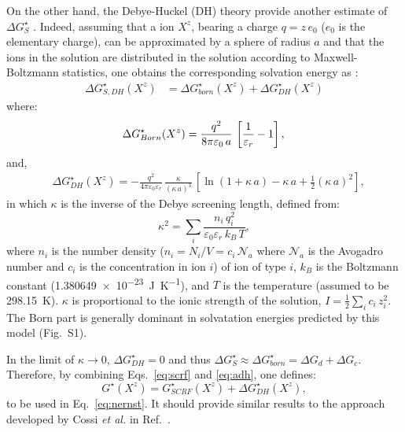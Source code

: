 \documentclass[review]{elsarticle}
\begin{document}
On the other hand, the Debye-Huckel (DH) theory provide another estimate of $\Delta G_{S}^\star$ \cite{bockrisModernElectrochemistryIonics1998}. Indeed, assuming that a ion $X^z$, bearing a charge $q = z\,e_0$ ($e_0$ is the elementary charge), can be approximated by a sphere of radius $a$ and that the ions in the solution are distributed in the solution according to Maxwell-Boltzmann statistics, one obtains the corresponding solvation energy as \cite{kontogeorgisDebyeHuckelTheoryIts2018,silvaDerivationsDebyeHuckel2022,silvaImprovingBornEquation2024}:\begin{align}
	\Delta G^\star_{S,DH}(X^z)
	&= \Delta G^\star_{born}(X^z) + \Delta G^\star_{DH}(X^z)\label{eq:adh}
\end{align}
where:
\begin{equation}
	\Delta G^\star_{Born}(X^z) =\frac{q^2}{8\pi\varepsilon_0\,a}\,\left[\frac{1}{\varepsilon_r}-1\right], \label{eq:born}\\
\end{equation}
and,
\begin{align}
	&\Delta G^\star_{DH}(X^z) = -\frac{q^2}{4\pi\varepsilon_0\varepsilon_r}\,\frac{\kappa}{(\kappa\,a)^3}\,\left[\ln(1+\kappa\,a)-\kappa\,a+\frac{1}{2}(\kappa\,a)^2\right],\label{eq:dh} \end{align}
in which $\kappa$ is the inverse of the Debye screening length, defined from:\begin{equation}
	\kappa^2 = \sum_i \frac{n_i\,q_i^2}{\varepsilon_0\varepsilon_r\,k_B\,T}, \label{eq:kappa2}
\end{equation}
where $n_i$ is the number density ($n_i = N_i / V = c_i\,\mathcal{N}_a$ where $\mathcal{N}_a$ is the Avogadro number and $c_i$ is the concentration in ion $i$) of ion of type $i$, $k_B$ is the Boltzmann constant (\SI{1.380649e-23}{\joule\per\kelvin}), and $T$ is the temperature (assumed to be \SI{298.15}{\kelvin}).  $\kappa$ is  proportional to the ionic strength of the solution, $I = \frac{1}{2}\sum_i c_i\,z_i^2$.  The Born part is generally dominant in solvatation energies predicted by this model (Fig.~S1).

In the limit of $\kappa\to 0$,  $\Delta G^\star_{DH} = 0$ and thus $\Delta G^\star_S \approx \Delta G^\star_{born} = \Delta G_d + \Delta G_c$.  Therefore, by combining Eqs.~\eqref{eq:scrf} and \eqref{eq:adh}, one defines:\begin{equation}
	G^\star(X^z) = G^\star_{SCRF}(X^z) + \Delta G^\star_{DH}(X^z), \label{eq:gtot}
\end{equation}
to be used in Eq.~\eqref{eq:nernst}. It should provide similar results to the approach developed by Cossi \emph{et al.} in Ref.~.
\end{document}
